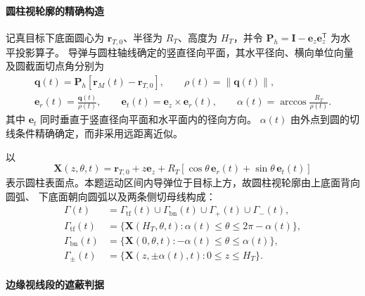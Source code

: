 \paragraph{圆柱视轮廓的精确构造}

记真目标下底面圆心为 $\boldsymbol r_{T,0}$、半径为 $R_T$、高度为 $H_T$，并令
$\boldsymbol P_h=\boldsymbol I-\boldsymbol e_z\boldsymbol e_z^{\mathsf T}$ 为水平投影算子。
导弹与圆柱轴线确定的竖直径向平面，其水平径向、横向单位向量及圆截面切点角分别为
\begin{equation}
  \begin{gathered}
    \boldsymbol q(t)=\boldsymbol P_h
    [\boldsymbol r_M(t)-\boldsymbol r_{T,0}],
    \qquad \rho(t)=\lVert\boldsymbol q(t)\rVert,\\
    \boldsymbol e_r(t)=\frac{\boldsymbol q(t)}{\rho(t)},
    \qquad \boldsymbol e_t(t)=\boldsymbol e_z\times\boldsymbol e_r(t),
    \qquad \alpha(t)=\arccos\!\frac{R_T}{\rho(t)}.
  \end{gathered}
  \label{eq:p1-edge-basis}
\end{equation}
其中 $\boldsymbol e_t$ 同时垂直于竖直径向平面和水平面内的径向方向。
$\alpha(t)$ 由外点到圆的切线条件精确确定，而非采用远距离近似。

以
\[
  \boldsymbol X(z,\theta,t)=\boldsymbol r_{T,0}+z\boldsymbol e_z
  +R_T[\cos\theta\,\boldsymbol e_r(t)+\sin\theta\,\boldsymbol e_t(t)]
\]
表示圆柱表面点。本题运动区间内导弹位于目标上方，故圆柱视轮廓由上底面背向圆弧、
下底面朝向圆弧以及两条侧切母线构成：
\begin{equation}
  \begin{aligned}
  \Gamma(t)&=\Gamma_{\mathrm{tf}}(t)\cup
  \Gamma_{\mathrm{bn}}(t)\cup\Gamma_{+}(t)\cup\Gamma_{-}(t),\\
  \Gamma_{\mathrm{tf}}(t)&=
  \{\boldsymbol X(H_T,\theta,t):\alpha(t)\le\theta\le2\pi-\alpha(t)\},\\
  \Gamma_{\mathrm{bn}}(t)&=
  \{\boldsymbol X(0,\theta,t):-\alpha(t)\le\theta\le\alpha(t)\},\\
  \Gamma_{\pm}(t)&=
  \{\boldsymbol X(z,\pm\alpha(t),t):0\le z\le H_T\}.
  \end{aligned}
  \label{eq:p1-edge-set}
\end{equation}

\paragraph{边缘视线段的遮蔽判据}

